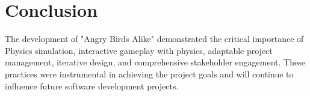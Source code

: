 \documentclass[12pt]{article}
\begin{document}
\section{Conclusion}
The development of "Angry Birds Alike" demonstrated the critical importance of Physics simulation, interactive gameplay with physics, adaptable project management, iterative design, and comprehensive stakeholder engagement. These practices were instrumental in achieving the project goals and will continue to influence future software development projects.
\end{document}
